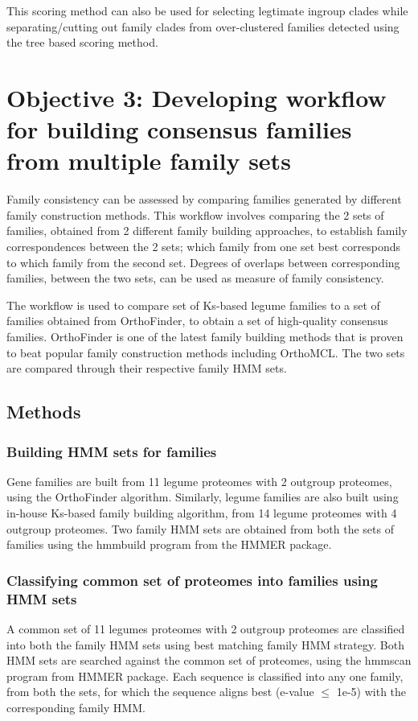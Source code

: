 \documentclass{article}
\begin{document}
		This scoring method can also be used for selecting legtimate ingroup clades while separating/cutting out family clades from over-clustered families detected using the tree based scoring method.
		
		
	\pagebreak
	
	\section{Objective 3: Developing workflow for building consensus families from multiple family sets}
	Family consistency can be assessed by comparing families generated by different family construction methods. This workflow involves comparing the 2 sets of families, obtained from 2 different family building approaches, to establish family correspondences between the 2 sets; which family from one set best corresponds to which family from the second set. Degrees of overlaps between corresponding families, between the two sets, can be used as measure of family consistency.
	
	The workflow is used to compare set of Ks-based legume families to a set of families obtained from OrthoFinder, to obtain a set of high-quality consensus families. OrthoFinder is one of the latest family building methods that is proven to beat popular family construction methods including OrthoMCL. The two sets are compared through their respective family HMM sets.
	
		\subsection{Methods}
			\subsubsection{Building HMM sets for families}
			Gene families are built from 11 legume proteomes with 2 outgroup proteomes, using the OrthoFinder algorithm. Similarly, legume families are also built using in-house Ks-based family building algorithm, from 14 legume proteomes with 4 outgroup proteomes. Two family HMM sets are obtained from both the sets of families using the hmmbuild program from the HMMER package.
			
			\subsubsection{Classifying common set of proteomes into families using HMM sets}
			A common set of 11 legumes proteomes with 2 outgroup proteomes are classified into both the family HMM sets using best matching family HMM strategy. Both HMM sets are searched against the common set of proteomes, using the hmmscan program from HMMER package. Each sequence is classified into any one family, from both the sets, for which the sequence aligns best (e-value $\leq$ 1e-5) with the corresponding family HMM.
			
\end{document}

